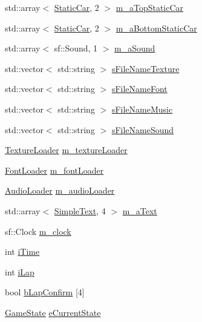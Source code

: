 \begin{DoxyCompactItemize}
std\+::array$<$ \hyperlink{class_static_car}{Static\+Car}, 2 $>$ \hyperlink{class_game_ac8205b8f1930f12fd4fdd71ab575bbdf}{m\+\_\+a\+Top\+Static\+Car}
\item 
std\+::array$<$ \hyperlink{class_static_car}{Static\+Car}, 2 $>$ \hyperlink{class_game_a0af48a2f04c50bfcb3d961dbd1a48332}{m\+\_\+a\+Bottom\+Static\+Car}
\item 
std\+::array$<$ sf\+::\+Sound, 1 $>$ \hyperlink{class_game_a9bbec66f60fb732629222dd90ba62778}{m\+\_\+a\+Sound}
\item 
std\+::vector$<$ std\+::string $>$ \hyperlink{class_game_afd0a84adb730239bae2eed9a8eded08e}{s\+File\+Name\+Texture}
\item 
std\+::vector$<$ std\+::string $>$ \hyperlink{class_game_a4989e4e035912a6cd8d00c8b2e627b43}{s\+File\+Name\+Font}
\item 
std\+::vector$<$ std\+::string $>$ \hyperlink{class_game_ad6b42e850d075a49c003f32fba1a2dd1}{s\+File\+Name\+Music}
\item 
std\+::vector$<$ std\+::string $>$ \hyperlink{class_game_a4bff69d4d76477050669e7f10d8d1da8}{s\+File\+Name\+Sound}
\item 
\hyperlink{class_texture_loader}{Texture\+Loader} \hyperlink{class_game_a361590f1fa6617f110b614b232b00631}{m\+\_\+texture\+Loader}
\item 
\hyperlink{class_font_loader}{Font\+Loader} \hyperlink{class_game_aa9d87d7d97d1651a68cc0301861e86e3}{m\+\_\+font\+Loader}
\item 
\hyperlink{class_audio_loader}{Audio\+Loader} \hyperlink{class_game_a4012ccf746dc592aff5ede39df9e2b17}{m\+\_\+audio\+Loader}
\item 
std\+::array$<$ \hyperlink{class_simple_text}{Simple\+Text}, 4 $>$ \hyperlink{class_game_a8a9e4f882c541075d13cad25ea2aec08}{m\+\_\+a\+Text}
\item 
sf\+::\+Clock \hyperlink{class_game_afa2b2cd71f1808971458e67a8540a83d}{m\+\_\+clock}
\item 
int \hyperlink{class_game_a377116aa9d1b98c95fc42f593bfefc33}{i\+Time}
\item 
int \hyperlink{class_game_a67d656a5608c3cd5cd3df69932bb16fb}{i\+Lap}
\item 
bool \hyperlink{class_game_a7eda5a4db623fc9e05fad674c9b9e6bb}{b\+Lap\+Confirm} \mbox{[}4\mbox{]}
\item 
\hyperlink{class_game_a7f57a7a8408e554d0a72882c287e1d04}{Game\+State} \hyperlink{class_game_ae0322dfc4abedec88046d09ca3460f35}{e\+Current\+State}
\end{DoxyCompactItemize}


